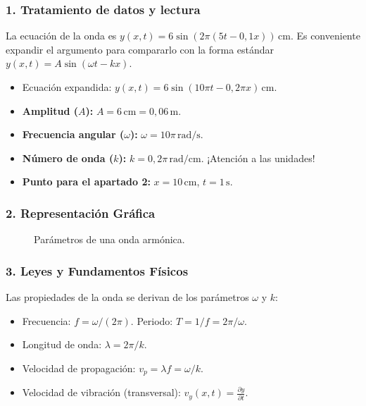 \subsubsection*{1. Tratamiento de datos y lectura}
La ecuación de la onda es $y(x,t) = 6\sin(2\pi (5t-0,1x))\,\text{cm}$. Es conveniente expandir el argumento para compararlo con la forma estándar $y(x,t) = A\sin(\omega t - kx)$.
\begin{itemize}
    \item Ecuación expandida: $y(x,t) = 6\sin(10\pi t - 0,2\pi x)\,\text{cm}$.
    \item \textbf{Amplitud ($A$):} $A = 6 \, \text{cm} = 0,06 \, \text{m}$.
    \item \textbf{Frecuencia angular ($\omega$):} $\omega = 10\pi \, \text{rad/s}$.
    \item \textbf{Número de onda ($k$):} $k = 0,2\pi \, \text{rad/cm}$. ¡Atención a las unidades!
    \item \textbf{Punto para el apartado 2:} $x = 10 \, \text{cm}$, $t = 1 \, \text{s}$.
\end{itemize}

\subsubsection*{2. Representación Gráfica}
\begin{figure}[H]
    \centering
    \caption{Parámetros de una onda armónica.}
\end{figure}

\subsubsection*{3. Leyes y Fundamentos Físicos}
Las propiedades de la onda se derivan de los parámetros $\omega$ y $k$:
\begin{itemize}
    \item Frecuencia: $f = \omega / (2\pi)$. Periodo: $T = 1/f = 2\pi / \omega$.
    \item Longitud de onda: $\lambda = 2\pi / k$.
    \item Velocidad de propagación: $v_p = \lambda f = \omega / k$.
    \item Velocidad de vibración (transversal): $v_y(x,t) = \frac{\partial y}{\partial t}$.
\end{itemize}

